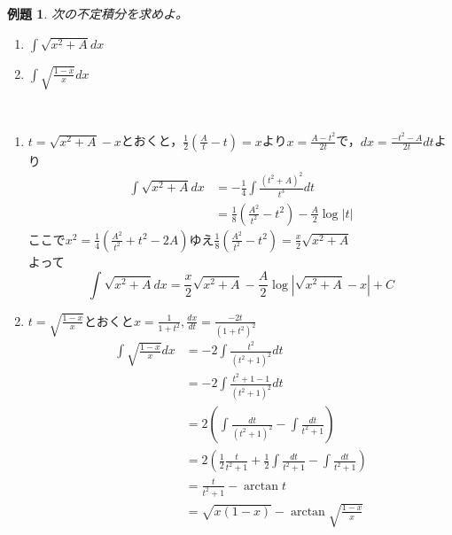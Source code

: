 \documentclass[dvipdfmx,a4j,10pt]{jsarticle}
\makeatletter
\theoremstyle{mystyle1}
\newtheorem{ex}[dfn]{例題}
\theoremstyle{mystyle2}
\newtheorem{ans}{解答}
\renewenvironment{ans}[1][解答]{\par
  \pushQED{\qed}%
  \normalfont
  \topsep6\p@\@plus6\p@ \trivlist
  \item[\hskip\labelsep{\bfseries\sffamily #1}]\ignorespaces
}{%
  \popQED\endtrivlist\@endpefalse
}
\makeatother
\begin{document}
\begin{shaded}
    \begin{ex}\label{ex9.6}
        次の不定積分を求めよ。
        \begin{enumerate}
            \item
            $\int\sqrt{x^2+A}dx$
            \item
            $\displaystyle\int\sqrt{\frac{1-x}{x}}dx$
        \end{enumerate}
    \end{ex}
\end{shaded}

\begin{ans}[解答\ref{ex9.6}]\
    \begin{enumerate}
        \item
        $t=\sqrt{x^2+A}-x$とおくと，$\displaystyle\frac{1}{2}\left(\frac{A}{t}-t\right)=x$より$\displaystyle x=\frac{A-t^2}{2t}$で，$\displaystyle dx=\frac{-t^2-A}{2t}dt$より
        \[
        \begin{split}
        \int\sqrt{x^2+A}dx
        &=-\frac{1}{4}\int\frac{(t^2+A)^2}{t^3}dt\\
        &=\frac{1}{8}\left(\frac{A^2}{t^2}-t^2\right)-\frac{A}{2}\log{|t|}
        \end{split}
        \]
        ここで$\displaystyle x^2=\frac{1}{4}\left(\frac{A^2}{t^2}+t^2-2A\right)$ゆえ$\displaystyle\frac{1}{8}\left(\frac{A^2}{t^2}-t^2\right)=\frac{x}{2}\sqrt{x^2+A}$\\
        よって
        \[
        \int\sqrt{x^2+A}dx=\frac{x}{2}\sqrt{x^2+A}-\frac{A}{2}\log{\left|\sqrt{x^2+A}-x\right|}+C
        \]

        \item
        $\displaystyle t=\sqrt{\frac{1-x}{x}}$とおくと$\displaystyle x=\frac{1}{1+t^2},\frac{dx}{dt}=\frac{-2t}{(1+t^2)^2}$
        \[
        \begin{split}
        \int\sqrt{\frac{1-x}{x}}dx
        &=-2\int\frac{t^2}{(t^2+1)^2}dt\\
        &=-2\int\frac{t^2+1-1}{(t^2+1)^2}dt\\
        &=2\left(\int\frac{dt}{(t^2+1)^2}-\int\frac{dt}{t^2+1}\right)\\
        &=2\left(\frac{1}{2}\frac{t}{t^2+1}+\frac{1}{2}\int\frac{dt}{t^2+1}-\int\frac{dt}{t^2+1}\right)\\
        &=\frac{t}{t^2+1}-\arctan{t}\\
        &=\sqrt{x(1-x)}-\arctan{\sqrt{\frac{1-x}{x}}}
        \end{split}
        \]
    \end{enumerate}
\end{ans}
\end{document}
